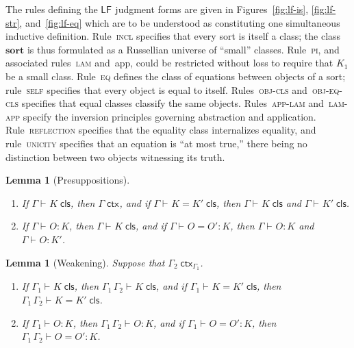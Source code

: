 \documentclass[11pt,twoside]{article}
\newtheorem{lemma}[theorem]{Lemma}
\newcommand{\LF}[1][]{\ensuremath{\mathsf{LF}_{#1}}}
\newcommand{\sortclass}{\ensuremath{\textbf{sort}}}
\newcommand{\appctx}[2]{{#1}\,{#2}}
\newcommand{\isctx}[2][]{{#2}\;\mathsf{ctx}_{#1}}
\newcommand{\iscls}[3][]{{#2}\vdash_{#1}{#3}\;\mathsf{cls}}
\newcommand{\eqcls}[4][]{{#2}\vdash_{#1}{#3}={#4}\;\mathsf{cls}}
\newcommand{\isobj}[4][]{{#2}\vdash_{#1}{#3}:{#4}}
\newcommand{\eqobj}[5][]{{#2}\vdash_{#1}{#3}={#4}:{#5}}
\begin{document}
The rules defining the \LF{} judgment forms are given in Figures~\ref{fig:lf-is},
\ref{fig:lf-str}, and~\ref{fig:lf-eq} which are to be understood as constituting one
simultaneous inductive definition.  Rule~\textsc{incl} specifies that every sort is itself
a class; the class $\sortclass$ is thus formulated as a Russellian universe of ``small''
classes.  Rule~\textsc{pi}, and associated rules~\textsc{lam} and~\textsf{app}, could be
restricted without loss to require that $K_{1}$ be a small class.  Rule~\textsc{eq}
defines the class of equations between objects of a sort; rule~\textsc{self} specifies
that every object is equal to itself.  Rules~\textsc{obj-cls} and~\textsc{obj-eq-cls}
specifies that equal classes classify the same objects.  Rules~\textsc{app-lam}
and~\textsc{lam-app} specify the inversion principles governing abstraction and
application.  Rule~\textsc{reflection} specifies that the equality class internalizes
equality, and rule~\textsc{unicity} specifies that an equation is ``at most true,'' there
being no distinction between two objects witnessing its truth.

\begin{lemma}[Presuppositions]
  \label{lemma:presup}
  \begin{enumerate}
  \item If\/ $\iscls{\Gamma}{K}$, then $\isctx{\Gamma}$, and if\/ $\eqcls{\Gamma}{K}{K'}$, then $\iscls{\Gamma}{K}$
    and $\iscls{\Gamma}{K'}$.
  \item If\/ $\isobj{\Gamma}{O}{K}$, then $\iscls{\Gamma}{K}$, and if\/ $\eqobj{\Gamma}{O}{O'}{K}$, then
    $\isobj{\Gamma}{O}{K}$ and $\isobj{\Gamma}{O}{K'}$.
  \end{enumerate}
\end{lemma}

\begin{lemma}[Weakening]
  \label{lemma:weak}
  Suppose that $\isctx[\Gamma_1]{\Gamma_2}$.
  \begin{enumerate}
  \item If\/ $\iscls{\Gamma_1}{K}$, then $\iscls{\appctx{\Gamma_{1}}{\Gamma_2}}{K}$, and if\/
    $\eqcls{\Gamma_1}{K}{K'}$, then $\eqcls{\appctx{\Gamma_1}{\Gamma_2}}{K}{K'}$.
  \item If\/ $\isobj{\Gamma_1}{O}{K}$, then $\isobj{\appctx{\Gamma_1}{\Gamma_2}}{O}{K}$, and if\/
    $\eqobj{\Gamma_1}{O}{O'}{K}$, then $\eqobj{\appctx{\Gamma_1}{\Gamma_2}}{O}{O'}{K}$.
  \end{enumerate}
\end{lemma}
\end{document}
